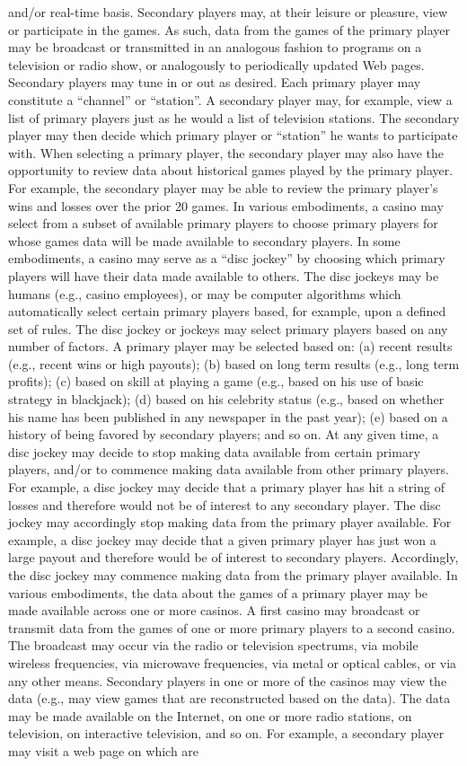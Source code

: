 \documentclass[11pt,a4paper]{article}
\begin{document}
and/or real-time basis. Secondary players may, at their leisure or pleasure, view or participate in the games. As such, data from the games of the primary player may be broadcast or transmitted in an analogous fashion to programs on a television or radio show, or analogously to periodically updated Web pages. Secondary players may tune in or out as desired. Each primary player may constitute a “channel” or “station”. A secondary player may, for example, view a list of primary players just as he would a list of television stations. The secondary player may then decide which primary player or “station” he wants to participate with. When selecting a primary player, the secondary player may also have the opportunity to review data about historical games played by the primary player. For example, the secondary player may be able to review the primary player's wins and losses over the prior 20 games. In various embodiments, a casino may select from a subset of available primary players to choose primary players for whose games data will be made available to secondary players. In some embodiments, a casino may serve as a “disc jockey” by choosing which primary players will have their data made available to others. The disc jockeys may be humans (e.g., casino employees), or may be computer algorithms which automatically select certain primary players based, for example, upon a defined set of rules. The disc jockey or jockeys may select primary players based on any number of factors. A primary player may be selected based on: (a) recent results (e.g., recent wins or high payouts); (b) based on long term results (e.g., long term profits); (c) based on skill at playing a game (e.g., based on his use of basic strategy in blackjack); (d) based on his celebrity status (e.g., based on whether his name has been published in any newspaper in the past year); (e) based on a history of being favored by secondary players; and so on. At any given time, a disc jockey may decide to stop making data available from certain primary players, and/or to commence making data available from other primary players. For example, a disc jockey may decide that a primary player has hit a string of losses and therefore would not be of interest to any secondary player. The disc jockey may accordingly stop making data from the primary player available. For example, a disc jockey may decide that a given primary player has just won a large payout and therefore would be of interest to secondary players. Accordingly, the disc jockey may commence making data from the primary player available. In various embodiments, the data about the games of a primary player may be made available across one or more casinos. A first casino may broadcast or transmit data from the games of one or more primary players to a second casino. The broadcast may occur via the radio or television spectrums, via mobile wireless frequencies, via microwave frequencies, via metal or optical cables, or via any other means. Secondary players in one or more of the casinos may view the data (e.g., may view games that are reconstructed based on the data). The data may be made available on the Internet, on one or more radio stations, on television, on interactive television, and so on. For example, a secondary player may visit a web page on which are 
\end{document}
